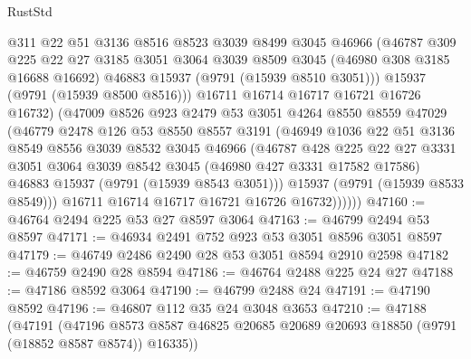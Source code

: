 \begin{lexlean}{RustStd}
\begin{coremodule}
                @311
                @22
                @51
                @3136
                @8516
                @8523
                @3039
                @8499
                @3045
                @46966
                (@46787
                  @309
                  @225
                  @22
                  @27
                  @3185
                  @3051
                  @3064
                  @3039
                  @8509
                  @3045
                  (@46980 @308 @3185 @16688 @16692)
                  @46883
                  @15937
                  (@9791 (@15939 @8510 @3051)))
                @15937
                (@9791 (@15939 @8500 @8516)))
              @16711
              @16714
              @16717
              @16721
              @16726
              @16732)
            (@47009
              @8526
              @923
              @2479
              @53
              @3051
              @4264
              @8550
              @8559
              @47029
              (@46779
                @2478
                @126
                @53
                @8550
                @8557
                @3191
                (@46949
                  @1036
                  @22
                  @51
                  @3136
                  @8549
                  @8556
                  @3039
                  @8532
                  @3045
                  @46966
                  (@46787
                    @428
                    @225
                    @22
                    @27
                    @3331
                    @3051
                    @3064
                    @3039
                    @8542
                    @3045
                    (@46980 @427 @3331 @17582 @17586)
                    @46883
                    @15937
                    (@9791 (@15939 @8543 @3051)))
                  @15937
                  (@9791 (@15939 @8533 @8549)))
                @16711
                @16714
                @16717
                @16721
                @16726
                @16732))))))
@47160 := @46764 @2494 @225 @53 @27 @8597 @3064
@47163 := @46799 @2494 @53 @8597
@47171 := @46934 @2491 @752 @923 @53 @3051 @8596 @3051 @8597
@47179 := @46749 @2486 @2490 @28 @53 @3051 @8594 @2910 @2598
@47182 := @46759 @2490 @28 @8594
@47186 := @46764 @2488 @225 @24 @27
@47188 := @47186 @8592 @3064
@47190 := @46799 @2488 @24
@47191 := @47190 @8592
@47196 := @46807 @112 @35 @24 @3048 @3653
@47210 := @47188
    (@47191
      (@47196 @8573 @8587 @46825 @20685 @20689 @20693 @18850 (@9791 (@18852 @8587 @8574)) @16335))

\end{coremodule}
\end{lexlean}
